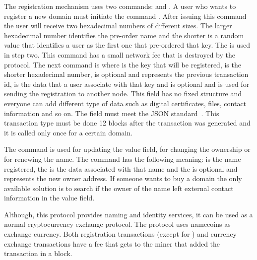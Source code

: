 The registration mechanism uses two commands:   and . A user who wants to register a new domain must initiate the command . After issuing this command the user will receive two hexadecimal numbers of different sizes. The larger hexadecimal number identifies the pre-order name and the shorter is a random value that identifies a user as the first one that pre-ordered that key. The  is used in step two.
This command has a small network fee that is destroyed by the protocol.
The next command is  where  is the key that will be registered,  is the shorter hexadecimal number, \code{[<tx>]} is optional and represents the previous transaction id,  is the data that a user associate with that key and  is optional and is used for sending the registration to another node. This field  has no fixed structure and everyone can add different type of data such as digital certificates, files, contact information and so on. The   field must meet the JSON standard~\cite{rfc7159}.
This transaction type must be done 12 blocks after the  transaction was generated and it is called only once for a certain domain.

The command  is used for updating the value field, for changing the ownership or for renewing the name. The command  has the following meaning:  is the name registered, the  is the data associated with that name and the \code{[<toaddress>]} is optional and represents the new owner address.
If someone wants to buy a domain the only available solution is to search if the owner of the name left external contact information in the value field.

Although, this protocol provides naming and identity services, it can be used as a normal cryptocurrency exchange protocol. The protocol uses namecoins as exchange currency. Both registration transactions (except for ) and currency exchange transactions have a fee that gets to the miner that added the transaction in a block.

